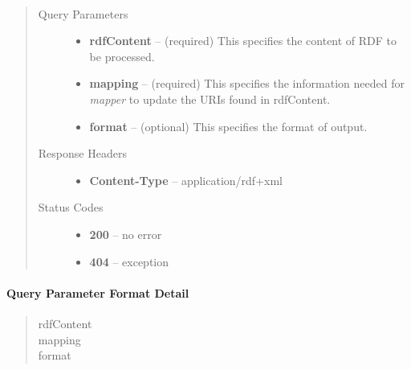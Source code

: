 \documentclass[letterpaper,10pt,english]{sphinxmanual}
\begin{document}
\begin{fulllineitems}
\label{user_guide:post--mapper_?rdfContent, mapping, format_}~\begin{quote}\begin{description}
\item[{Query Parameters}] \leavevmode\begin{itemize}
\item {} 
\textbf{rdfContent} -- (required) This specifies the content of RDF to be processed.

\item {} 
\textbf{mapping} -- (required) This specifies the information needed for \emph{mapper} to update the URIs found in rdfContent.

\item {} 
\textbf{format} -- (optional) This specifies the format of output.

\end{itemize}

\item[{Response Headers}] \leavevmode\begin{itemize}
\item {} 
\textbf{Content-Type} -- application/rdf+xml

\end{itemize}

\item[{Status Codes}] \leavevmode\begin{itemize}
\item {} 
\textbf{200} -- no error

\item {} 
\textbf{404} -- exception

\end{itemize}

\end{description}\end{quote}

\end{fulllineitems}



\paragraph{Query Parameter Format Detail}
\label{user_guide:id3}\begin{quote}\begin{description}
\item[{rdfContent}] \leavevmode
\item[{mapping}] \leavevmode
\item[{format}] \leavevmode
\end{description}\end{quote}
\end{document}
